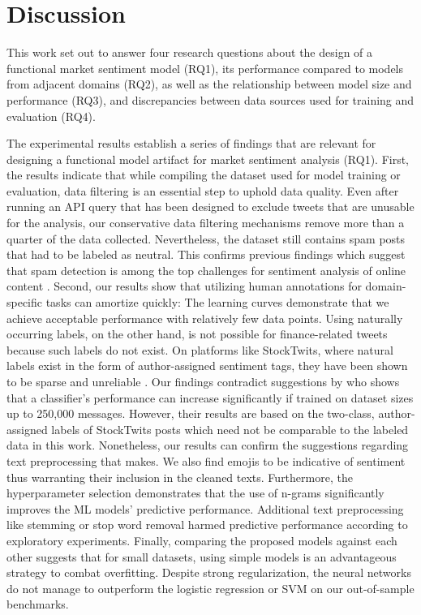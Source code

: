 \section{Discussion}

This work set out to answer four research questions about the design of a functional market sentiment model (RQ1), its performance compared to models from adjacent domains (RQ2), as well as the relationship between model size and performance (RQ3), and discrepancies between data sources used for training and evaluation (RQ4).

The experimental results establish a series of findings that are relevant for designing a functional model artifact for market sentiment analysis (RQ1). First, the results indicate that while compiling the dataset used for model training or evaluation, data filtering is an essential step to uphold data quality. Even after running an API query that has been designed to exclude tweets that are unusable for the analysis, our conservative data filtering mechanisms remove more than a quarter of the data collected. Nevertheless, the dataset still contains spam posts that had to be labeled as neutral. This confirms previous findings which suggest that spam detection is among the top challenges for sentiment analysis of online content . Second, our results show that utilizing human annotations for domain-specific tasks can amortize quickly: The learning curves demonstrate that we achieve acceptable performance with relatively few data points. Using naturally occurring labels, on the other hand, is not possible for finance-related tweets because such labels do not exist. On platforms like StockTwits, where natural labels exist in the form of author-assigned sentiment tags, they have been shown to be sparse and unreliable . Our findings contradict suggestions by  who shows that a classifier's performance can increase significantly if trained on dataset sizes up to 250,000 messages. However, their results are based on the two-class, author-assigned labels of StockTwits posts which need not be comparable to the labeled data in this work. Nonetheless, our results can confirm the suggestions regarding text preprocessing that  makes. We also find emojis to be indicative of sentiment thus warranting their inclusion in the cleaned texts. Furthermore, the hyperparameter selection demonstrates that the use of n-grams significantly improves the ML models' predictive performance. Additional text preprocessing like stemming or stop word removal harmed predictive performance according to exploratory experiments. Finally, comparing the proposed models against each other suggests that for small datasets, using simple models is an advantageous strategy to combat overfitting. Despite strong regularization, the neural networks do not manage to outperform the logistic regression or SVM on our out-of-sample benchmarks.

